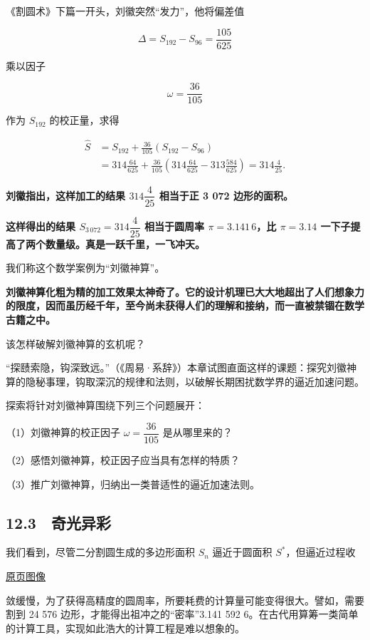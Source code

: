 \documentclass[
  10pt,
  fontset=fandol]{ctexart}
\begin{document}
《割圆术》下篇一开头，刘徽突然``发力''，他将偏差值

\[
\Delta=S_{192}-S_{96}=\frac{105}{625}
\]

乘以因子

\[
\omega=\frac{36}{105}
\tag{12.2.1}
\]

作为 \(S_{192}\) 的校正量，求得

\[
\begin{aligned}
\widehat S&=S_{192}+\frac{36}{105}(S_{192}-S_{96})\\
&=314\frac{64}{625}+\frac{36}{105}\left(314\frac{64}{625}-313\frac{584}{625}\right)=314\frac{4}{25}.
\end{aligned}
\tag{12.2.2}
\]

\textbf{刘徽指出，这样加工的结果 \(314\dfrac{4}{25}\) 相当于正 3 072 边形的面积。}

\textbf{这样得出的结果 \(S_{3\,072}=314\dfrac{4}{25}\) 相当于圆周率 \(\pi=3.141\,6\)，比 \(\pi=3.14\) 一下子提高了两个数量级。真是一跃千里，一飞冲天。}

我们称这个数学案例为``刘徽神算''。

\textbf{刘徽神算化粗为精的加工效果太神奇了。它的设计机理已大大地超出了人们想象力的限度，因而虽历经千年，至今尚未获得人们的理解和接纳，而一直被禁锢在数学古籍之中。}

该怎样破解刘徽神算的玄机呢？

``探赜索隐，钩深致远。''（《周易·系辞》）本章试图直面这样的课题：探究刘徽神算的隐秘事理，钩取深沉的规律和法则，以破解长期困扰数学界的逼近加速问题。

探索将针对刘徽神算围绕下列三个问题展开：

（1）刘徽神算的校正因子 \(\omega=\dfrac{36}{105}\) 是从哪里来的？

（2）感悟刘徽神算，校正因子应当具有怎样的特质？

（3）推广刘徽神算，归纳出一类普适性的逼近加速法则。

\subsection{12.3　奇光异彩}\label{ux5947ux5149ux5f02ux5f69}

我们看到，尽管二分割圆生成的多边形面积 \(S_n\) 逼近于圆面积 \(S^*\)，但逼近过程收

\href{../../source-images/pdf-298.jpeg}{原页图像}

敛缓慢，为了获得高精度的圆周率，所要耗费的计算量可能变得很大。譬如，需要割到 24 576 边形，才能得出祖冲之的``密率''3.141 592 6。在古代用算筹一类简单的计算工具，实现如此浩大的计算工程是难以想象的。
\end{document}
